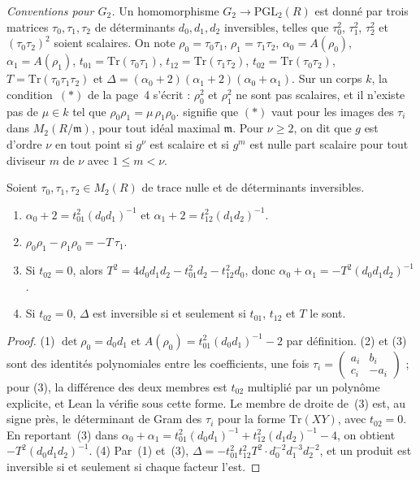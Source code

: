 \noindent\emph{Conventions pour $G_2$.} Un homomorphisme $G_2 \to \mathrm{PGL}_2(R)$ est donné par trois matrices $\tau_0, \tau_1, \tau_2$ de déterminants $d_0, d_1, d_2$ inversibles, telles que $\tau_0^2$, $\tau_1^2$, $\tau_2^2$ et $(\tau_0\tau_2)^2$ soient scalaires. On note $\rho_0 = \tau_0\tau_1$, $\rho_1 = \tau_1\tau_2$, $\alpha_0 = A(\rho_0)$, $\alpha_1 = A(\rho_1)$, $t_{01} = \mathrm{Tr}(\tau_0\tau_1)$, $t_{12} = \mathrm{Tr}(\tau_1\tau_2)$, $t_{02} = \mathrm{Tr}(\tau_0\tau_2)$, $T = \mathrm{Tr}(\tau_0\tau_1\tau_2)$ et $\Delta = (\alpha_0 + 2)(\alpha_1 + 2)(\alpha_0 + \alpha_1)$. Sur un corps $k$, la condition~$(*)$ de la page~4 s'écrit : $\rho_0^2$ et $\rho_1^2$ ne sont pas scalaires, et il n'existe pas de $\mu \in k$ tel que $\rho_0\rho_1 = \mu\,\rho_1\rho_0$.  signifie que $(*)$ vaut pour les images des $\tau_i$ dans $M_2(R/\mathfrak m)$, pour tout idéal maximal $\mathfrak m$. Pour $\nu \geq 2$, on dit que $g$ est d'ordre $\nu$ en tout point si $g^\nu$ est scalaire et si $g^m$ est nulle part scalaire pour tout diviseur $m$ de $\nu$ avec $1 \leq m < \nu$.

\begin{lemme}\label{lem:85-traces}
Soient $\tau_0, \tau_1, \tau_2 \in M_2(R)$ de trace nulle et de déterminants inversibles.
\begin{enumerate}
\item $\alpha_0 + 2 = t_{01}^2 (d_0 d_1)^{-1}$ et $\alpha_1 + 2 = t_{12}^2 (d_1 d_2)^{-1}$.
\item $\rho_0\rho_1 - \rho_1\rho_0 = -T\,\tau_1$.
\item Si $t_{02} = 0$, alors $T^2 = 4 d_0 d_1 d_2 - t_{01}^2 d_2 - t_{12}^2 d_0$, donc $\alpha_0 + \alpha_1 = -T^2 (d_0 d_1 d_2)^{-1}$.
\item Si $t_{02} = 0$, $\Delta$ est inversible si et seulement si $t_{01}$, $t_{12}$ et $T$ le sont.
\end{enumerate}
\end{lemme}

\begin{proof}
(1) $\det \rho_0 = d_0 d_1$ et $A(\rho_0) = t_{01}^2 (d_0 d_1)^{-1} - 2$ par définition. (2) et (3) sont des identités polynomiales entre les coefficients, une fois $\tau_i = \begin{pmatrix} a_i & b_i \\ c_i & -a_i \end{pmatrix}$ ; pour (3), la différence des deux membres est $t_{02}$ multiplié par un polynôme explicite, et Lean la vérifie sous cette forme. Le membre de droite de~(3) est, au signe près, le déterminant de Gram des $\tau_i$ pour la forme $\mathrm{Tr}(XY)$, avec $t_{02} = 0$. En reportant~(3) dans $\alpha_0 + \alpha_1 = t_{01}^2(d_0d_1)^{-1} + t_{12}^2(d_1d_2)^{-1} - 4$, on obtient $-T^2(d_0d_1d_2)^{-1}$. (4) Par~(1) et~(3), $\Delta = -t_{01}^2 t_{12}^2 T^2 \cdot d_0^{-2} d_1^{-3} d_2^{-2}$, et un produit est inversible si et seulement si chaque facteur l'est.
\end{proof}

